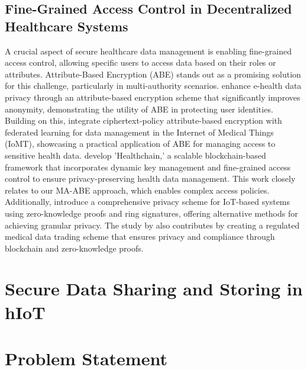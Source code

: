 \documentclass[cic,tc,english]{iiufrgs}
\begin{document}
        \subsection{Fine-Grained Access Control in Decentralized Healthcare Systems}
            A crucial aspect of secure healthcare data management is enabling fine-grained access control, allowing specific users to access data based on their roles or attributes. Attribute-Based Encryption (ABE) stands out as a promising solution for this challenge, particularly in multi-authority scenarios. \citet{Zala2024} enhance e-health data privacy through an attribute-based encryption scheme that significantly improves anonymity, demonstrating the utility of ABE in protecting user identities. Building on this, \citet{Bhansali2022} integrate ciphertext-policy attribute-based encryption with federated learning for data management in the Internet of Medical Things (IoMT), showcasing a practical application of ABE for managing access to sensitive health data. \citet{XuJie2019} develop 'Healthchain,' a scalable blockchain-based framework that incorporates dynamic key management and fine-grained access control to ensure privacy-preserving health data management. This work closely relates to our MA-ABE approach, which enables complex access policies. Additionally, \citet{Esfahani2024} introduce a comprehensive privacy scheme for IoT-based systems using zero-knowledge proofs and ring signatures, offering alternative methods for achieving granular privacy. The study by \citet{Li2024} also contributes by creating a regulated medical data trading scheme that ensures privacy and compliance through blockchain and zero-knowledge proofs.
    

    \section{Secure Data Sharing and Storing in hIoT}
        \label{sec:securedata}

    \section{Problem Statement}
        \label{sec:problemstatement}
\end{document}

